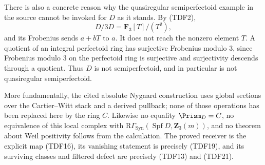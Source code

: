 \documentclass[
  10pt,
]{article}
\begin{document}
There is also a concrete reason why the quasiregular semiperfectoid
example in the source cannot be invoked for \(D\) as it stands. By
(TDF2), \[
 D/3D=\mathbf F_3[T]/(T^2),
\] and its Frobenius sends \(a+bT\) to \(a\). It does not reach the
nonzero element \(T\). A quotient of an integral perfectoid ring has
surjective Frobenius modulo \(3\), since Frobenius modulo \(3\) on the
perfectoid ring is surjective and surjectivity descends through a
quotient. Thus \(D\) is not semiperfectoid, and in particular is not
quasiregular semiperfectoid.

More fundamentally, the cited absolute Nygaard construction uses global
sections over the Cartier--Witt stack and a derived pullback; none of
those operations has been replaced here by the ring \(C\). Likewise no
equality \(\Prism_D=C\), no equivalence of this local complex with
\(\mathrm R\Gamma_{\mathrm{Syn}}(\operatorname{Spf}D,\mathbf Z_3(m))\),
and no theorem about Weil positivity follows from the calculation. The
proved receiver is the explicit map (TDF16), its vanishing statement is
precisely (TDF19), and its surviving classes and filtered defect are
precisely (TDF13) and (TDF21).
\end{document}
